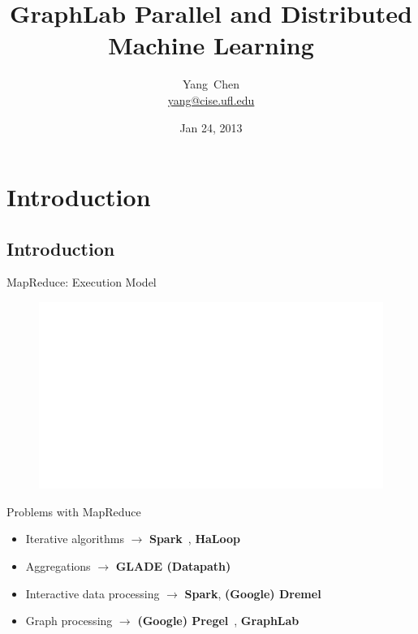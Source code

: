 \documentclass[onlymath,xcolor=pdftex,dvipsnames,table]{beamer}
\title[GraphLab Distributed Machine Learning]%
{GraphLab Parallel and Distributed Machine Learning}
\author %
{Yang~Chen\\{\footnotesize\url{yang@cise.ufl.edu}}}
\institute[University of Florida] %
{
  Computer and Information Science and Engineering\\
  University of Florida\\
}
\date{Jan 24, 2013} %
\theoremstyle{remark} %
\begin{document}
\maketitle

\section{Introduction}
\subsection{Introduction}

\begin{frame}{MapReduce: Execution Model}
\begin{figure}
  \centering
  \includegraphics[width=.75\textwidth]{mapreduce.pdf}
\end{figure}
\end{frame}

\begin{frame}{Problems with MapReduce}
\begin{itemize}
  \item Iterative algorithms $\rightarrow$ \textbf{Spark}~\cite{zaharia2010spark}, \textbf{HaLoop}~\cite{bu2010haloop}
  \item Aggregations $\rightarrow$ \textbf{GLADE (Datapath)}~\cite{rusu2012glade,arumugam2010datapath}
  \item Interactive data processing $\rightarrow$ \textbf{Spark}, \textbf{(Google) Dremel}~\cite{melnik2010dremel}
  \item Graph processing $\rightarrow$ \textbf{(Google) Pregel}~\cite{malewicz2010pregel}, \textbf{GraphLab}~\cite{low2010graphlab,low2012distributed}
\end{itemize}
\end{frame}
\end{document}
